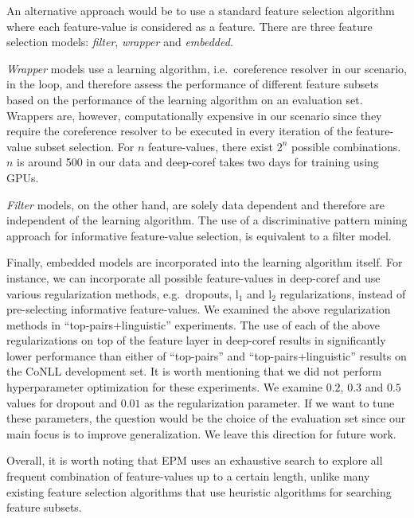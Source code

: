 \documentclass[11pt,a4paper]{article}
\begin{document}
An alternative approach would be to use a standard feature selection algorithm where each feature-value is considered as a feature.
There are three feature selection models: \emph{filter}, \emph{wrapper} and \emph{embedded}.

\emph{Wrapper} models use a learning algorithm, i.e.\ coreference resolver in our scenario, in the loop, and therefore assess the performance
of different feature subsets based on the performance of the learning algorithm on an evaluation set.
Wrappers are, however, 
computationally expensive in our scenario since they require the coreference resolver to be executed in
every iteration of the feature-value subset selection. For $n$ feature-values, there exist $2^n$ possible combinations. $n$ is around 500 in our data and deep-coref takes two days for training using GPUs.


\emph{Filter} models, on the other hand, are solely data dependent and therefore are independent of the learning algorithm.
The use of a discriminative pattern mining approach for informative feature-value selection, is equivalent to a filter model.

Finally, embedded models are
incorporated into the learning algorithm itself.
For instance, we can incorporate all possible feature-values in deep-coref and use 
various regularization methods, e.g.\ dropouts, l$_1$ and l$_2$ regularizations, instead of pre-selecting informative feature-values.
We examined the above regularization methods in ``top-pairs+linguistic'' experiments.
The use of each of the above regularizations on top of the feature layer in deep-coref
results in significantly lower performance than either of ``top-pairs'' and ``top-pairs+linguistic'' results on the CoNLL development set.
It is worth mentioning that we did not perform hyperparameter optimization for these experiments.
We examine $0.2$, $0.3$ and $0.5$ values for dropout and $0.01$ as the regularization parameter.
If we want to tune these parameters, the question would be the choice of the evaluation set since our main focus is to improve generalization. We leave this direction for future work.

Overall, it is worth noting that EPM uses an exhaustive search to explore all frequent combination of feature-values up to a certain length, unlike many existing feature selection algorithms that use heuristic algorithms for searching feature subsets.

\iffalse
\end{document}
